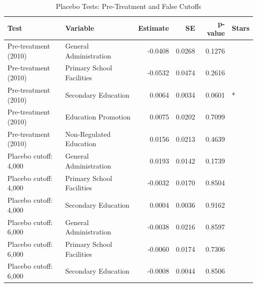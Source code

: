 \begin{table}[!h]
\centering
\caption{\label{tab:placebo}Placebo Tests: Pre-Treatment and False Cutoffs}
\centering
\begin{tabular}[t]{llrrrl}
\toprule
Test & Variable & Estimate & SE & p-value & Stars\\
\midrule
Pre-treatment (2010) & General Administration & -0.0408 & 0.0268 & 0.1276 & \\
Pre-treatment (2010) & Primary School Facilities & -0.0532 & 0.0474 & 0.2616 & \\
Pre-treatment (2010) & Secondary Education & 0.0064 & 0.0034 & 0.0601 & *\\
Pre-treatment (2010) & Education Promotion & 0.0075 & 0.0202 & 0.7099 & \\
Pre-treatment (2010) & Non-Regulated Education & 0.0156 & 0.0213 & 0.4639 & \\
\addlinespace
Placebo cutoff: 4,000 & General Administration & 0.0193 & 0.0142 & 0.1739 & \\
Placebo cutoff: 4,000 & Primary School Facilities & -0.0032 & 0.0170 & 0.8504 & \\
Placebo cutoff: 4,000 & Secondary Education & 0.0004 & 0.0036 & 0.9162 & \\
Placebo cutoff: 6,000 & General Administration & -0.0038 & 0.0216 & 0.8597 & \\
Placebo cutoff: 6,000 & Primary School Facilities & -0.0060 & 0.0174 & 0.7306 & \\
\addlinespace
Placebo cutoff: 6,000 & Secondary Education & -0.0008 & 0.0044 & 0.8506 & \\
\bottomrule
\end{tabular}
\end{table}
